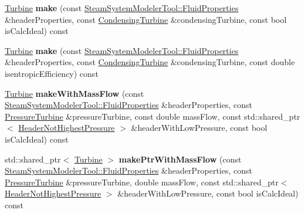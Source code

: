 \begin{DoxyCompactItemize}
\item 
\mbox{\label{class_turbine_factory_a7a7ed3809be731fa9768fbed3f03f869}} 
\hyperlink{class_turbine}{Turbine} {\bfseries make} (const \hyperlink{struct_steam_system_modeler_tool_1_1_fluid_properties}{Steam\+System\+Modeler\+Tool\+::\+Fluid\+Properties} \&header\+Properties, const \hyperlink{class_condensing_turbine}{Condensing\+Turbine} \&condensing\+Turbine, const bool is\+Calc\+Ideal) const
\item 
\mbox{\label{class_turbine_factory_abfdd2414b20185135168f89ec0bccc9f}} 
\hyperlink{class_turbine}{Turbine} {\bfseries make} (const \hyperlink{struct_steam_system_modeler_tool_1_1_fluid_properties}{Steam\+System\+Modeler\+Tool\+::\+Fluid\+Properties} \&header\+Properties, const \hyperlink{class_condensing_turbine}{Condensing\+Turbine} \&condensing\+Turbine, const double isentropic\+Efficiency) const
\item 
\mbox{\label{class_turbine_factory_ab589b4af489fc3baa773d76d83f7417f}} 
\hyperlink{class_turbine}{Turbine} {\bfseries make\+With\+Mass\+Flow} (const \hyperlink{struct_steam_system_modeler_tool_1_1_fluid_properties}{Steam\+System\+Modeler\+Tool\+::\+Fluid\+Properties} \&header\+Properties, const \hyperlink{class_pressure_turbine}{Pressure\+Turbine} \&pressure\+Turbine, const double mass\+Flow, const std\+::shared\+\_\+ptr$<$ \hyperlink{class_header_not_highest_pressure}{Header\+Not\+Highest\+Pressure} $>$ \&header\+With\+Low\+Pressure, const bool is\+Calc\+Ideal) const
\item 
\mbox{\label{class_turbine_factory_a095c98e5b3fad3dedce6afad6a0760b9}} 
std\+::shared\+\_\+ptr$<$ \hyperlink{class_turbine}{Turbine} $>$ {\bfseries make\+Ptr\+With\+Mass\+Flow} (const \hyperlink{struct_steam_system_modeler_tool_1_1_fluid_properties}{Steam\+System\+Modeler\+Tool\+::\+Fluid\+Properties} \&header\+Properties, const \hyperlink{class_pressure_turbine}{Pressure\+Turbine} \&pressure\+Turbine, double mass\+Flow, const std\+::shared\+\_\+ptr$<$ \hyperlink{class_header_not_highest_pressure}{Header\+Not\+Highest\+Pressure} $>$ \&header\+With\+Low\+Pressure, const bool is\+Calc\+Ideal) const
\item 
\mbox{\label{class_turbine_factory_af298ec9ac7d96e670c28f7552dc238bc}} 

\end{DoxyCompactItemize}
